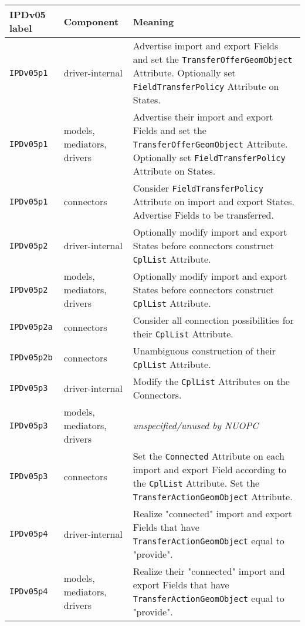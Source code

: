 \vspace*{3ex}
\begin{longtable}[h]{|p{}|p{}|p{}|}
     \hline\hline
     {\bf IPDv05 label} & {\bf Component} & {\bf Meaning}\\
     \hline\hline
     {\tt IPDv05p1}   & driver-internal             & Advertise import and export Fields and set the {\tt TransferOfferGeomObject} Attribute. Optionally set {\tt FieldTransferPolicy} Attribute on States. \\ \hline
     {\tt IPDv05p1}   & models, mediators, drivers  & Advertise their import and export Fields and set the {\tt TransferOfferGeomObject} Attribute. Optionally set {\tt FieldTransferPolicy} Attribute on States. \\ \hline
     {\tt IPDv05p1}   & connectors                  & Consider {\tt FieldTransferPolicy} Attribute on import and export States. Advertise Fields to be transferred. \\ \hline
     {\tt IPDv05p2}   & driver-internal             & Optionally modify import and export States before connectors construct {\tt CplList} Attribute. \\ \hline
     {\tt IPDv05p2}   & models, mediators, drivers  & Optionally modify import and export States before connectors construct {\tt CplList} Attribute. \\ \hline
     {\tt IPDv05p2a}  & connectors                  & Consider all connection possibilities for their {\tt CplList} Attribute.\\ \hline
     {\tt IPDv05p2b}  & connectors                  & Unambiguous construction of their {\tt CplList} Attribute.\\ \hline
     {\tt IPDv05p3}   & driver-internal             & Modify the {\tt CplList} Attributes on the Connectors.\\ \hline
     {\tt IPDv05p3}   & models, mediators, drivers  & {\em unspecified/unused by NUOPC}\\ \hline
     {\tt IPDv05p3}   & connectors                  & Set the {\tt Connected} Attribute on each import and export Field according to the {\tt CplList} Attribute. Set the {\tt TransferActionGeomObject} Attribute.\\ \hline
     {\tt IPDv05p4}   & driver-internal             & Realize "connected" import and export Fields that have {\tt TransferActionGeomObject} equal to "provide".\\ \hline
     {\tt IPDv05p4}   & models, mediators, drivers  & Realize their "connected" import and export Fields that have {\tt TransferActionGeomObject} equal to "provide".\\ \hline

\end{longtable}
